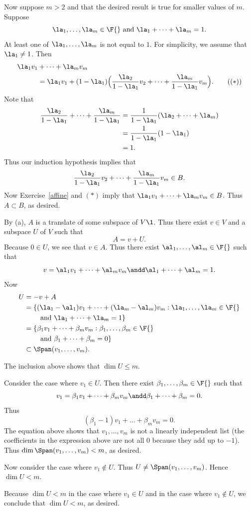 \begin{Solution}
\begin{subtheorem}
Now suppose $m > 2$ and that the desired result is true for smaller values of $m$. Suppose
\[
 \la_1, \dots, \la_m \in \F{}\ \text{and}\ \la_1 + \dots + \la_m = 1.
 \]
 At least one of $ \la_1, \dots, \la_m$ is not equal to $1$. For simplicity, we assume that $\la_1 \ne 1$. Then
 \begin{align}
 \la_1 v_1 &+ \dots + \la_m v_m \notag\\
 &=\la_1 v_1 + (1-\la_1)\Bigl( \frac{\la_2}{1-\la_1} v_2 + \dots + \frac{\la_m}{1-\la_1}v_m \Bigr).
 \tag{$(*)$}
 \end{align}
Note that
\begin{align*}
\frac{\la_2}{1-\la_1} + \dots + \frac{\la_m}{1-\la_1}
&= \frac{1}{1-\la_1}(\la_2 + \dots + \la_m)\\
&= \frac{1}{1-\la_1}(1 -  \la_1)\\
&= 1.
\end{align*}
Thus our induction hypothesis implies that
\[
 \frac{\la_2}{1-\la_1} v_2 + \dots + \frac{\la_m}{1-\la_1}v_m \in B.
 \]
Now Exercise~\ref{affine} and $(*)$ imply that $ \la_1 v_1 + \dots + \la_m v_m \in B$. Thus $A \subset B$, as desired.

\item
By (a), $A$ is a translate of some subspace of $V\1$. Thus there exist $v \in V$ and a subspace $U$ of $V$ such that
\[
A = v + U.
\]
Because $0 \in U$, we see that $v \in A$. Thus there exist $\al_1, \dots, \al_m \in \F{}$ such that
\[
v = \al_1 v_1 + \dots + \al_m v_m \andd \al_1 + \dots + \al_m = 1.
\]
Now
\begin{align*}
U &= -v + A \\
&= \{(\la_1 - \al_1) v_1 + \dots + (\la_m - \al_m) v_m : \la_1, \dots, \la_m \in \F{} \\
&\quad \quad \text{\ and\ } \la_1 + \dots + \la_m = 1\} \\
&= \{ \beta_1 v_1 + \dots + \beta_m v_m : \beta_1, \dots, \beta_m \in \F{}  \\
&\quad \quad\text{\ and\ } \beta_1 + \dots + \beta_m = 0\}\\
& \subset \Span(v_1, \dots, v_m).
\end{align*}
\end{subtheorem}
The inclusion above shows that $\dim U \le m$.

Consider the case where $v_1 \in U$. Then there exist $\beta_1, \dots, \beta_m \in \F{}$ such that
\[
v_1 = \beta_1 v_1 + \dots + \beta_m v_m \andd \beta_1 + \dots + \beta_m = 0.
\]
Thus
\[
(\beta_1 - 1) v_1 + \dots + \beta_m v_m = 0.
\]
The equation above shows that $v_1, \dots, v_m$ is not a linearly independent list (the coefficients in the expression above are not all $0$ because they add up to $-1$). Thus $\dim \Span(v_1, \dots, v_m) < m$, as desired.

Now consider the case where $v_1 \notin U$. Thus $U \ne \Span(v_1, \dots, v_m)$. Hence
$\dim U < m$.

Because $\dim U < m$ in the case where $v_1 \in U$ and in the case where $v_1 \notin U$, we conclude that
$\dim U < m$, as desired.
\end{Solution}

